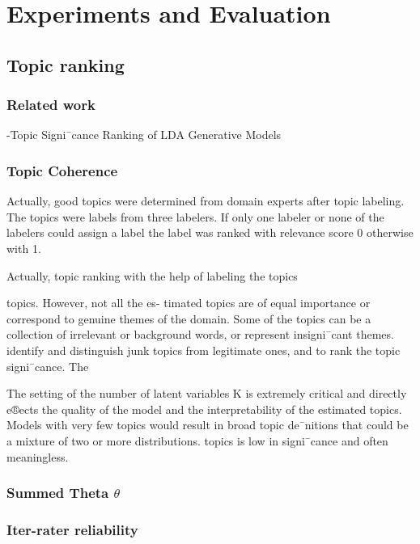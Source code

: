 \chapter{Experiments and Evaluation}
\section{Topic ranking}


\subsection{Related work}
-Topic Signi¯cance Ranking of LDA Generative
Models

\subsection{Topic Coherence}
Actually, good topics were determined from domain experts after topic labeling. The topics were labels from three labelers. If only one labeler or none of the labelers could assign a label the label was ranked with relevance score 0 otherwise with 1.


Actually, topic ranking with the help of labeling the topics 


topics. However, not all the es-
timated topics are of equal importance or correspond to genuine themes
of the domain. Some of the topics can be a collection of irrelevant or
background words, or represent insigni¯cant themes.
identify and distinguish
junk topics from legitimate ones, and to rank the topic signi¯cance. The

The setting of the number of latent variables K is extremely critical and
directly e®ects the quality of the model and the interpretability of the estimated
topics. Models with very few topics would result in broad topic de¯nitions that
could be a mixture of two or more distributions.
topics is low in signi¯cance and
often meaningless.


\subsection{Summed Theta $\theta$}
\subsection{Iter-rater reliability}


